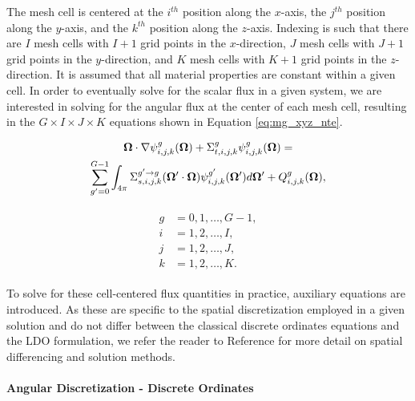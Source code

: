 The mesh cell is centered at the $i^{th}$ position along the $x$-axis, the $j^{th}$
position along the $y$-axis, and the  $k^{th}$ position along the $z$-axis. Indexing
is such that there are $I$ mesh cells with $I+1$ grid points in the $x$-direction, $J$ mesh
cells with $J+1$ grid points in the $y$-direction, and $K$ mesh cells with $K+1$ grid points in 
the $z$-direction. It is assumed that all material 
properties are constant within a given cell. In order to eventually solve for the 
scalar flux in a given system, we are interested in solving for the angular flux at 
the center of each mesh cell, resulting in the $G\times I \times J \times K$
equations shown in Equation \ref{eq:mg_xyz_nte}.

\begin{minipage}{0.65\textwidth}
\begin{multline*}
\label{eq:mg_xyz_nte}
\mathbf\Omega\cdot\nabla\psi^g_{i,j,k}(\mathbf\Omega)+\Sigma_{t,i,j,k}^g\psi^g_{i,j,k}(\mathbf\Omega) =  \\
\sum_{g'=0}^{G-1}\int_{4\pi} \Sigma_{s,i,j,k}^{g'\rightarrow g}(\mathbf\Omega'\cdot\mathbf\Omega)
\psi^{g'}_{i,j,k}(\mathbf\Omega')d\mathbf\Omega' + Q^g_{i,j,k}(\mathbf\Omega),
\end{multline*}
\end{minipage}
\begin{minipage}{0.31\textwidth}
\begin{align}
\begin{split}
g &= 0,1,\ldots,G-1,\\
i &= 1,2,\ldots,I,\\
j &= 1,2,\ldots,J,\\
k &= 1,2,\ldots,K.
\end{split}
\end{align}
\end{minipage} \strut

\noindent To solve for these cell-centered flux 
quantities in practice, auxiliary equations are introduced. As these are specific to the 
spatial discretization employed in a given solution and do not differ between the classical
discrete ordinates equations and the LDO formulation, we refer the reader to Reference
\cite{denovo} for more detail on spatial differencing and solution methods.

\paragraph{Angular Discretization - Discrete Ordinates}\mbox{} \\
\label{sec:do}

